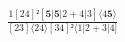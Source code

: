 \documentclass[varwidth, border=5pt]{standalone}
\begin{document}
\begin{my}
$\begin{gathered}
\scriptscriptstyle\frac{1[24]²[𝟓|𝟓|2+4|3]⟨4𝟓⟩}{[23]⟨24⟩[34]²⟨1|2+3|4]}
\end{gathered}$
\end{my}
\end{document}
